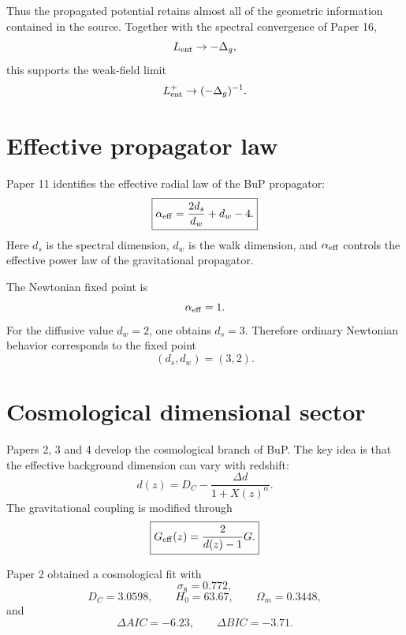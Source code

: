 \documentclass[11pt,a4paper]{article}
\begin{document}
Thus the propagated potential retains almost all of the geometric information
contained in the source. Together with the spectral convergence of Paper 16,
\begin{equation}
  L_{\rm ent}\to-\Delta_g,
\end{equation}
this supports the weak-field limit
\begin{equation}
  L_{\rm ent}^{+}\to(-\Delta_g)^{-1}.
\end{equation}

\section{Effective propagator law}

Paper 11 identifies the effective radial law of the BuP propagator:
\begin{equation}
  \boxed{
  \alpha_{\rm eff}
  =
  \frac{2d_s}{d_w}
  +
  d_w
  -
  4.
  }
  \label{eq:alpha_eff}
\end{equation}
Here \(d_s\) is the spectral dimension, \(d_w\) is the walk dimension, and
\(\alpha_{\rm eff}\) controls the effective power law of the gravitational
propagator.

The Newtonian fixed point is
\begin{equation}
  \alpha_{\rm eff}=1.
\end{equation}
For the diffusive value \(d_w=2\), one obtains \(d_s=3\). Therefore ordinary
Newtonian behavior corresponds to the fixed point
\begin{equation}
  \boxed{(d_s,d_w)=(3,2).}
\end{equation}

\section{Cosmological dimensional sector}

Papers 2, 3 and 4 develop the cosmological branch of BuP. The key idea is that
the effective background dimension can vary with redshift:
\begin{equation}
  d(z)=D_C-\frac{\Delta d}{1+X(z)^\alpha}.
\end{equation}
The gravitational coupling is modified through
\begin{equation}
  \boxed{
  G_{\rm eff}(z)=\frac{2}{d(z)-1}G.
  }
\end{equation}

Paper 2 obtained a cosmological fit with
\begin{equation}
  \sigma_8=0.772,
\end{equation}
\begin{equation}
  D_C=3.0598,
  \qquad
  H_0=63.67,
  \qquad
  \Omega_m=0.3448,
\end{equation}
and
\begin{equation}
  \Delta AIC=-6.23,
  \qquad
  \Delta BIC=-3.71.
\end{equation}
\end{document}

